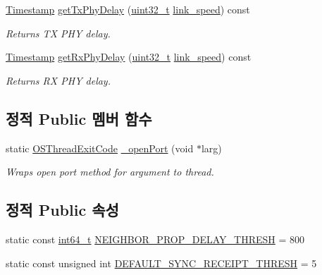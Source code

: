 \begin{DoxyCompactItemize}
\hyperlink{class_timestamp}{Timestamp} \hyperlink{class_common_port_a712d7ef3c08417057a911fa3fa574770}{get\+Tx\+Phy\+Delay} (\hyperlink{parse_8c_a6eb1e68cc391dd753bc8ce896dbb8315}{uint32\+\_\+t} \hyperlink{class_common_port_aae24fc4f200e75aa8215f797b2561dbf}{link\+\_\+speed}) const 
\begin{DoxyCompactList}\small\item\em Returns TX P\+HY delay. \end{DoxyCompactList}\item 
\hyperlink{class_timestamp}{Timestamp} \hyperlink{class_common_port_a4c0962d6e8bd5a6296d9cdd77d26c30e}{get\+Rx\+Phy\+Delay} (\hyperlink{parse_8c_a6eb1e68cc391dd753bc8ce896dbb8315}{uint32\+\_\+t} \hyperlink{class_common_port_aae24fc4f200e75aa8215f797b2561dbf}{link\+\_\+speed}) const 
\begin{DoxyCompactList}\small\item\em Returns RX P\+HY delay. \end{DoxyCompactList}\end{DoxyCompactItemize}
\subsection*{정적 Public 멤버 함수}
\begin{DoxyCompactItemize}
\item 
static \hyperlink{avbts__osthread_8hpp_a82108124541f8ae837064a49057d2f82}{O\+S\+Thread\+Exit\+Code} \hyperlink{class_wireless_port_a5ef80974dd87917c2ea0c796bf41822e}{\+\_\+open\+Port} (void $\ast$larg)
\begin{DoxyCompactList}\small\item\em Wraps open port method for argument to thread. \end{DoxyCompactList}\end{DoxyCompactItemize}
\subsection*{정적 Public 속성}
\begin{DoxyCompactItemize}
\item 
static const \hyperlink{parse_8c_a67a9885ef4908cb72ce26d75b694386c}{int64\+\_\+t} \hyperlink{class_common_port_ad2b817903e69443f936de3f2d195184d}{N\+E\+I\+G\+H\+B\+O\+R\+\_\+\+P\+R\+O\+P\+\_\+\+D\+E\+L\+A\+Y\+\_\+\+T\+H\+R\+E\+SH} = 800
\item 
static const unsigned int \hyperlink{class_common_port_a60ff1c9798251f4f4be45dfb8ea91614}{D\+E\+F\+A\+U\+L\+T\+\_\+\+S\+Y\+N\+C\+\_\+\+R\+E\+C\+E\+I\+P\+T\+\_\+\+T\+H\+R\+E\+SH} = 5
\end{DoxyCompactItemize}
